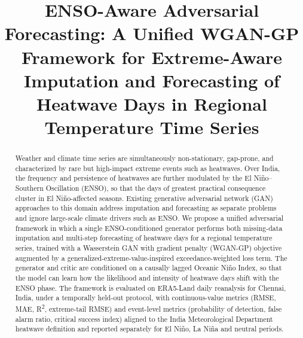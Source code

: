 \documentclass[conference]{IEEEtran}
\begin{document}
\title{ENSO-Aware Adversarial Forecasting: A Unified WGAN-GP Framework for Extreme-Aware Imputation and Forecasting of Heatwave Days in Regional Temperature Time Series}

\author{
\and
{}
\and
{}
}

\maketitle

\begin{abstract}
Weather and climate time series are simultaneously non-stationary, gap-prone, and characterized by
rare but high-impact extreme events such as heatwaves. Over India, the frequency and persistence of
heatwaves are further modulated by the El Ni\~{n}o--Southern Oscillation (ENSO), so that the days of
greatest practical consequence cluster in El Ni\~{n}o-affected seasons. Existing generative adversarial
network (GAN) approaches to this domain address imputation and forecasting as separate problems and
ignore large-scale climate drivers such as ENSO. We propose a unified adversarial framework in which a
single ENSO-conditioned generator performs both missing-data imputation and multi-step forecasting of
heatwave days for a regional temperature series, trained with a Wasserstein GAN with gradient penalty
(WGAN-GP) objective augmented by a generalized-extreme-value-inspired exceedance-weighted loss term.
The generator and critic are conditioned on a causally lagged Oceanic Ni\~{n}o Index, so that the model
can learn how the likelihood and intensity of heatwave days shift with the ENSO phase. The framework is
evaluated on ERA5-Land daily reanalysis for Chennai, India, under a temporally held-out protocol, with
continuous-value metrics (RMSE, MAE, R\textsuperscript{2}, extreme-tail RMSE) and event-level metrics
(probability of detection, false alarm ratio, critical success index) aligned to the India
Meteorological Department heatwave definition and reported separately for El Ni\~{n}o, La Ni\~{n}a and
neutral periods.
\end{abstract}
\end{document}
